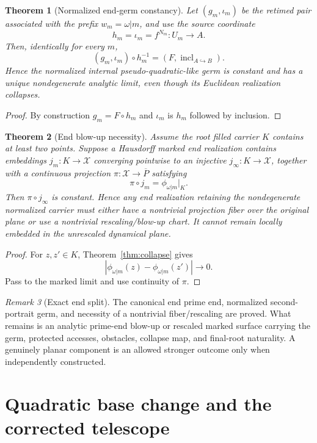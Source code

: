 \documentclass[11pt]{article}
\newtheorem{theorem}{Theorem}[section]
\theoremstyle{definition}
\theoremstyle{remark}
\newtheorem{remark}[theorem]{Remark}
\begin{document}
\begin{theorem}[Normalized end-germ constancy]\label{thm:germ}
Let $(g_m,\iota_m)$ be the retimed pair associated with the prefix $w_m=\omega|m$, and use the source coordinate
\[
 h_m=\iota_m=f^{N_m}:U_m\to A.
\]
Then, identically for every $m$,
\[
 (g_m,\iota_m)\circ h_m^{-1}
 =(F,\operatorname{incl}_{A\hookrightarrow B}).
\]
Hence the normalized internal pseudo-quadratic-like germ is constant and has a unique nondegenerate analytic limit, even though its Euclidean realization collapses.
\end{theorem}

\begin{proof}
By construction $g_m=F\circ h_m$ and $\iota_m$ is $h_m$ followed by inclusion.
\end{proof}

\begin{theorem}[End blow-up necessity]\label{thm:blowup}
Assume the root filled carrier $K$ contains at least two points.  Suppose a Hausdorff marked end realization contains embeddings $j_m:K\to\mathcal X$ converging pointwise to an injective $j_\infty:K\to\mathcal X$, together with a continuous projection $\pi:\mathcal X\to\overline P$ satisfying
\[
 \pi\circ j_m=\phi_{\omega|m}|_K.
\]
Then $\pi\circ j_\infty$ is constant.  Hence any end realization retaining the nondegenerate normalized carrier must either have a nontrivial projection fiber over the original plane or use a nontrivial rescaling/blow-up chart.  It cannot remain locally embedded in the unrescaled dynamical plane.
\end{theorem}

\begin{proof}
For $z,z'\in K$, Theorem~\ref{thm:collapse} gives
\[
 |\phi_{\omega|m}(z)-\phi_{\omega|m}(z')|\to0.
\]
Pass to the marked limit and use continuity of $\pi$.
\end{proof}

\begin{remark}[Exact end split]
The canonical end prime end, normalized second-portrait germ, and necessity of a nontrivial fiber/rescaling are proved.  What remains is an analytic prime-end blow-up or rescaled marked surface carrying the germ, protected accesses, obstacles, collapse map, and final-root naturality.  A genuinely planar component is an allowed stronger outcome only when independently constructed.
\end{remark}

\section{Quadratic base change and the corrected telescope}
\end{document}
